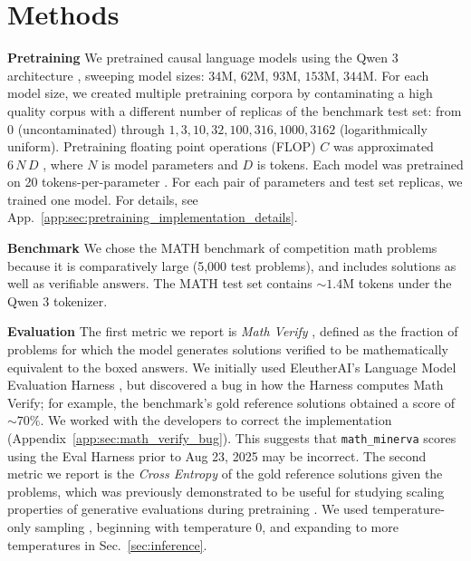 
\section{Methods}
\label{sec:methods}

\textbf{Pretraining} We pretrained causal language models \citep{vaswani2017attention, brown2020language} using the Qwen 3 architecture \citep{yang2025qwen3technicalreport}, sweeping model sizes: $34$M, $62$M, $93$M, $153$M, $344$M.
For each model size, we created multiple pretraining corpora by contaminating a high quality corpus \citep{penedo2024finewebdatasetsdecantingweb} with a different number of replicas of the benchmark test set: from $0$ (uncontaminated) through $1, 3, 10, 32, 100, 316, 1000, 3162$ (logarithmically uniform).
Pretraining floating point operations (FLOP) $C$ was approximated $ 6  \, N \, D$ \citep{kaplan2020scaling,sardana2024beyond,porian2024resolving,gadre2024languagemodelsscalereliably}, where $N$ is model parameters and $D$ is tokens.
Each model was pretrained on 20 tokens-per-parameter \citep{hoffman2022chinchilla}. 
For each pair of parameters and test set replicas, we trained one model.
For details, see App.~\ref{app:sec:pretraining_implementation_details}.

\textbf{Benchmark} We chose the MATH \citep{hendrycks2021measuringmathematicalproblemsolving} benchmark of competition math problems because it is comparatively large (5,000 test problems), and includes solutions as well as verifiable answers. 
The MATH test set contains $\mathord{\sim}1.4$M tokens under the Qwen 3 tokenizer.

\textbf{Evaluation} 
The first metric we report is \emph{Math Verify} \citep{kydlicek2025fixing}, defined as the fraction of problems for which the model generates solutions verified to be mathematically equivalent to the boxed answers.
We initially used EleutherAI's Language Model Evaluation Harness \citep{gao2024evalharness}, but discovered a bug in how the Harness computes Math Verify; for example, the benchmark's gold reference solutions obtained a score of $\mathord{\sim}70\%$.
We worked with the developers to correct the implementation (Appendix~\ref{app:sec:math_verify_bug}).
This suggests that \texttt{math\_minerva} scores using the Eval Harness prior to Aug 23, 2025 may be incorrect.
The second metric we report is the \emph{Cross Entropy} of the gold reference solutions given the problems, which was previously demonstrated to be useful for studying scaling properties of generative evaluations during pretraining \citep{schaeffer2025pretrainingscalinglawsgenerative}.
We used temperature-only sampling \citep{schaeffer2025minpmaxexaggerationcritical}, beginning with temperature $0$, and expanding to more temperatures in Sec.~\ref{sec:inference}.